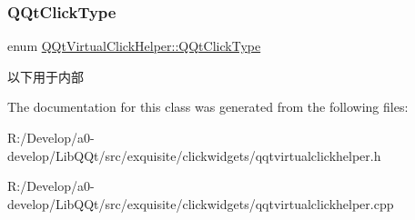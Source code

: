 \subsubsection{\texorpdfstring{Q\+Qt\+Click\+Type}{QQtClickType}}
{\footnotesize\ttfamily enum \mbox{\hyperlink{class_q_qt_virtual_click_helper_ace6c0c9b072e51f2cb3ff1316404b764}{Q\+Qt\+Virtual\+Click\+Helper\+::\+Q\+Qt\+Click\+Type}}}

以下用于内部 

The documentation for this class was generated from the following files\+:\begin{DoxyCompactItemize}
\item 
R\+:/\+Develop/a0-\/develop/\+Lib\+Q\+Qt/src/exquisite/clickwidgets/qqtvirtualclickhelper.\+h\item 
R\+:/\+Develop/a0-\/develop/\+Lib\+Q\+Qt/src/exquisite/clickwidgets/qqtvirtualclickhelper.\+cpp\end{DoxyCompactItemize}
